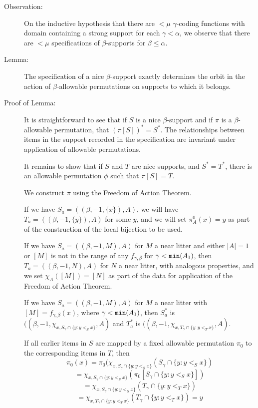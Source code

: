 \documentclass[112pt]{article}
\begin{document}
\begin{description}
\item[Observation:]  On the inductive hypothesis that there are $<\mu$ $\gamma$-coding functions with domain containing a strong support for each $\gamma<\alpha$, we observe that there are $<\mu$ specifications of $\beta$-supports for $\beta\leq \alpha$.

\item[Lemma:]  The specification of a nice $\beta$-support exactly determines the orbit in the action of $\beta$-allowable permutations on supports to which it belongs.

\item[Proof of Lemma:]

It is straightforward to see that if $S$ is a nice $\beta$-support and if $\pi$ is a $\beta$-allowable permutation, that $(\pi[S])^* = S^*$.  The relationships between items in the support recorded in the specification are invariant under application of allowable permutations.

It remains to show that if $S$ and $T$ are nice supports, and $S^*=T^*$, there is an allowable permutation $\phi$ such that $\pi[S]=T$.

We construct $\pi$ using the Freedom of Action Theorem.

If we have $S_a = ((\beta,-1,\{x\}),A)$, we will have $T_a = ((\beta,-1,\{y\}),A)$ for some $y$, and we will set $\pi^0_A(x) = y$ as part of the construction of the local bijection to be used.

If we have $S_a = ((\beta,-1,M),A)$ for $M$ a near litter and either $|A|=1$ or $[M]$ is not in the range of any $f_{\gamma,\beta}$ for $\gamma<{\tt min}(A_1)$, then $T_a = ((\beta,-1,N),A)$ for $N$ a near litter, with analogous properties, and we set $\chi_A([M])=[N]$ as part of the data for application of the Freedom of Action Theorem.

If we have $S_a= ((\beta,-1,M),A)$ for $M$ a near litter with $[M] = f_{\gamma,\beta}(x)$, where $\gamma<{\tt min}(A_1)$,
then $S^*_a$ is $((\beta,-1,\chi_{x,S_{\gamma}\cap \{y:y <_S x\}},A)$ and $T^*_a$ is $((\beta,-1,\chi_{x,T_{\gamma}\cap \{y:y <_T x\}},A).$

If all earlier items in $S$ are mapped by a fixed allowable permutation $\pi_0$ to the corresponding items in $T$, then
$$\pi_0(x) = \pi_0(\chi_{x,S_{\gamma}\cap \{y:y <_S x\}}(S_{\gamma}\cap \{y:y <_S x\}) $$ $$ = \chi_{x,S_{\gamma}\cap \{y:y <_S x\}}(\pi_0[S_{\gamma}\cap \{y:y <_S x\}])$$ $$ = \chi_{x,S_{\gamma}\cap \{y:y <_S x\}}(T_{\gamma}\cap \{y:y <_T x\}) $$ $$= \chi_{x,T_{\gamma}\cap \{y:y <_T x\}}(T_{\gamma}\cap \{y:y <_T x\})=y$$


\end{description}
\end{document}
